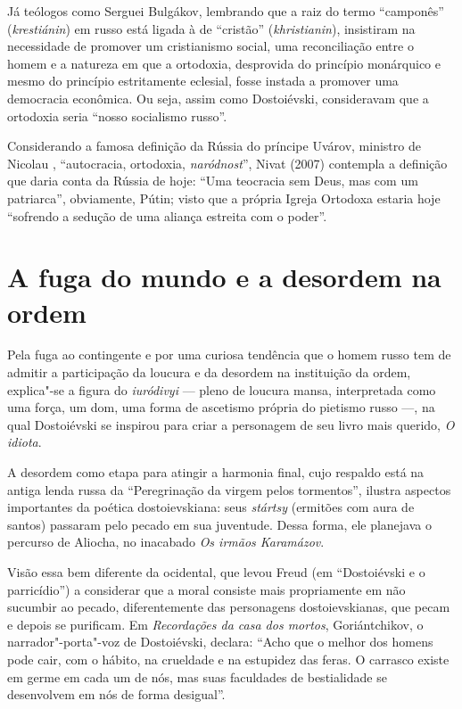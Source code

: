 Já teólogos como Serguei Bulgákov, lembrando que a raiz do termo ``camponês'' (\emph{krestiánin}) em russo está ligada à de ``cristão'' (\emph{khristianin}), insistiram na necessidade de promover um cristianismo social, uma reconciliação entre o homem e a natureza em que a ortodoxia, desprovida do princípio monárquico e mesmo do princípio estritamente eclesial, fosse instada a promover uma democracia econômica. Ou seja, assim como Dostoiévski, consideravam que a ortodoxia seria ``nosso socialismo russo''.

Considerando a famosa definição da Rússia do príncipe Uvárov, ministro de Nicolau , ``autocracia, ortodoxia, \emph{naródnost}'', Nivat (2007) contempla a definição que daria conta da Rússia de hoje: ``Uma teocracia sem Deus, mas com um patriarca'', obviamente, Pútin; visto que a própria Igreja Ortodoxa estaria hoje ``sofrendo a sedução de uma aliança estreita com o poder''.

\section{\uppercase{A} fuga do mundo e a desordem na ordem}

Pela fuga ao contingente e por uma curiosa tendência que o homem russo
tem de admitir a participação da loucura e da desordem na instituição da
ordem, explica"-se a figura do \emph{iuródivyi} --- pleno de loucura mansa,
interpretada como uma força, um dom, uma forma de ascetismo própria do
pietismo russo ---, na qual Dostoiévski se inspirou para criar a
personagem de seu livro mais querido, \emph{O idiota}.

A desordem como etapa para atingir a harmonia final, cujo respaldo está na antiga lenda russa da ``Peregrinação da virgem pelos tormentos'', ilustra aspectos importantes da poética dostoievskiana: seus \emph{stártsy} (ermitões com aura de santos) passaram pelo pecado em sua juventude. Dessa forma, ele planejava o percurso de Aliocha, no inacabado \emph{Os irmãos Karamázov}.

Visão essa bem diferente da ocidental, que levou Freud
(em ``Dostoiévski e o parricídio'') a considerar que a moral consiste
mais propriamente em não sucumbir ao pecado, diferentemente das
personagens dostoievskianas, que pecam e depois se purificam.
Em \emph{Recordações da casa dos mortos}, Goriántchikov, o
narrador"-porta"-voz de Dostoiévski, declara: ``Acho que o melhor dos
homens pode cair, com o hábito, na crueldade e na estupidez das feras. O carrasco existe em germe em cada um de nós, mas suas faculdades de bestialidade se desenvolvem em nós de forma desigual''.

